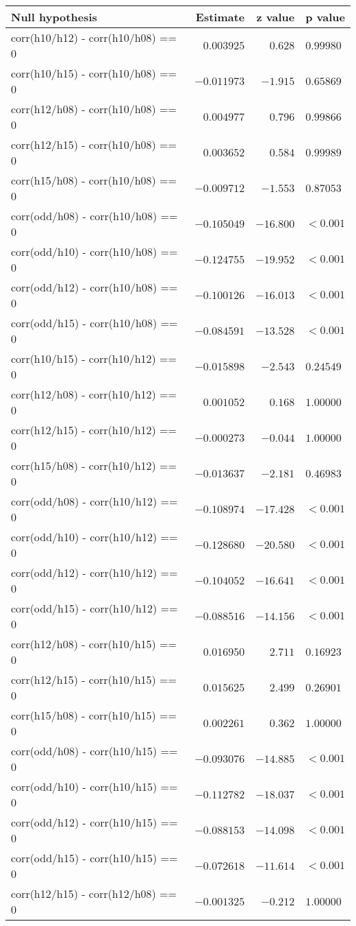\begin{table*}[t]\scriptsize
\caption{
}
\label{table:TukeyTable}
\centering
\begin{tabular}{l r r l}
\toprule
Null hypothesis & Estimate & z value & p value \tabularnewline
\toprule
corr(h10/h12) - corr(h10/h08)  == 0 & $  0.003925 $ & $   0.628 $ & $ 0.99980 $\tabularnewline
corr(h10/h15) - corr(h10/h08)  == 0 & $ -0.011973 $ & $  -1.915 $ & $ 0.65869 $\tabularnewline
corr(h12/h08) - corr(h10/h08)  == 0 & $  0.004977 $ & $   0.796 $ & $ 0.99866 $\tabularnewline
corr(h12/h15) - corr(h10/h08)  == 0 & $  0.003652 $ & $   0.584 $ & $ 0.99989 $\tabularnewline
corr(h15/h08) - corr(h10/h08)  == 0 & $ -0.009712 $ & $  -1.553 $ & $ 0.87053 $\tabularnewline
corr(odd/h08) - corr(h10/h08)  == 0 & $ -0.105049 $ & $ -16.800 $ & $< 0.001 $\tabularnewline
corr(odd/h10) - corr(h10/h08)  == 0 & $ -0.124755 $ & $ -19.952 $ & $< 0.001 $\tabularnewline
corr(odd/h12) - corr(h10/h08)  == 0 & $ -0.100126 $ & $ -16.013 $ & $< 0.001 $\tabularnewline
corr(odd/h15) - corr(h10/h08)  == 0 & $ -0.084591 $ & $ -13.528 $ & $< 0.001 $\tabularnewline
corr(h10/h15) - corr(h10/h12)  == 0 & $ -0.015898 $ & $  -2.543 $ & $ 0.24549 $\tabularnewline
corr(h12/h08) - corr(h10/h12)  == 0 & $  0.001052 $ & $   0.168 $ & $ 1.00000 $\tabularnewline
corr(h12/h15) - corr(h10/h12)  == 0 & $ -0.000273 $ & $  -0.044 $ & $ 1.00000 $\tabularnewline
corr(h15/h08) - corr(h10/h12)  == 0 & $ -0.013637 $ & $  -2.181 $ & $ 0.46983 $\tabularnewline
corr(odd/h08) - corr(h10/h12)  == 0 & $ -0.108974 $ & $ -17.428 $ & $< 0.001 $\tabularnewline
corr(odd/h10) - corr(h10/h12)  == 0 & $ -0.128680 $ & $ -20.580 $ & $< 0.001 $\tabularnewline
corr(odd/h12) - corr(h10/h12)  == 0 & $ -0.104052 $ & $ -16.641 $ & $< 0.001 $\tabularnewline
corr(odd/h15) - corr(h10/h12)  == 0 & $ -0.088516 $ & $ -14.156 $ & $< 0.001 $\tabularnewline
corr(h12/h08) - corr(h10/h15)  == 0 & $  0.016950 $ & $   2.711 $ & $ 0.16923 $\tabularnewline
corr(h12/h15) - corr(h10/h15)  == 0 & $  0.015625 $ & $   2.499 $ & $ 0.26901 $\tabularnewline
corr(h15/h08) - corr(h10/h15)  == 0 & $  0.002261 $ & $   0.362 $ & $ 1.00000 $\tabularnewline
corr(odd/h08) - corr(h10/h15)  == 0 & $ -0.093076 $ & $ -14.885 $ & $< 0.001 $\tabularnewline
corr(odd/h10) - corr(h10/h15)  == 0 & $ -0.112782 $ & $ -18.037 $ & $< 0.001 $\tabularnewline
corr(odd/h12) - corr(h10/h15)  == 0 & $ -0.088153 $ & $ -14.098 $ & $< 0.001 $\tabularnewline
corr(odd/h15) - corr(h10/h15)  == 0 & $ -0.072618 $ & $ -11.614 $ & $< 0.001 $\tabularnewline
corr(h12/h15) - corr(h12/h08)  == 0 & $ -0.001325 $ & $  -0.212 $ & $ 1.00000 $\tabularnewline

\end{tabular}
\end{table*}
